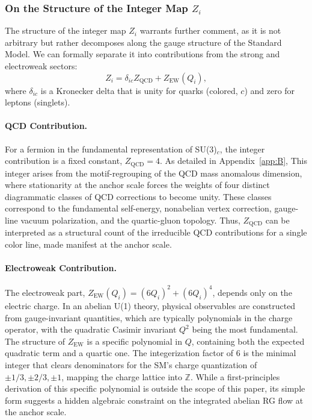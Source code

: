 \documentclass[aps,prd,onecolumn,amsmath,amssymb,superscriptaddress,nofootinbib,showpacs,showkeys]{revtex4-2}
\begin{document}
\subsubsection{On the Structure of the Integer Map \texorpdfstring{$Z_i$}{Zi}}
The structure of the integer map $Z_i$ warrants further comment, as it is not arbitrary but rather decomposes along the gauge structure of the Standard Model. We can formally separate it into contributions from the strong and electroweak sectors:
\begin{equation}
    Z_i = \delta_{ic} Z_{\mathrm{QCD}} + Z_{\mathrm{EW}}(Q_i),
\end{equation}
where $\delta_{ic}$ is a Kronecker delta that is unity for quarks (colored, $c$) and zero for leptons (singlets).

\paragraph{QCD Contribution.} For a fermion in the fundamental representation of SU(3)$_c$, the integer contribution is a fixed constant, $Z_{\mathrm{QCD}}=4$. As detailed in Appendix~\ref{app:B},
This integer arises from the motif-regrouping of the QCD mass anomalous dimension, where stationarity at the anchor scale forces the weights of four distinct diagrammatic classes of QCD corrections to become unity. These classes correspond to the fundamental self-energy, nonabelian vertex correction, gauge-line vacuum polarization, and the quartic-gluon topology. Thus, $Z_{\mathrm{QCD}}$ can be interpreted as a structural count of the irreducible QCD contributions for a single color line, made manifest at the anchor scale.

\paragraph{Electroweak Contribution.} The electroweak part, $Z_{\mathrm{EW}}(Q_i) = (6Q_i)^2 + (6Q_i)^4$, depends only on the electric charge. In an abelian U(1) theory, physical observables are constructed from gauge-invariant quantities, which are typically polynomials in the charge operator, with the quadratic Casimir invariant $Q^2$ being the most fundamental. The structure of $Z_{\mathrm{EW}}$ is a specific polynomial in $Q$, containing both the expected quadratic term and a quartic one. The integerization factor of 6 is the minimal integer that clears denominators for the SM's charge quantization of $\pm 1/3, \pm 2/3, \pm 1$, mapping the charge lattice into $\mathbb{Z}$. While a first-principles derivation of this specific polynomial is outside the scope of this paper, its simple form suggests a hidden algebraic constraint on the integrated abelian RG flow at the anchor scale.
\end{document}
